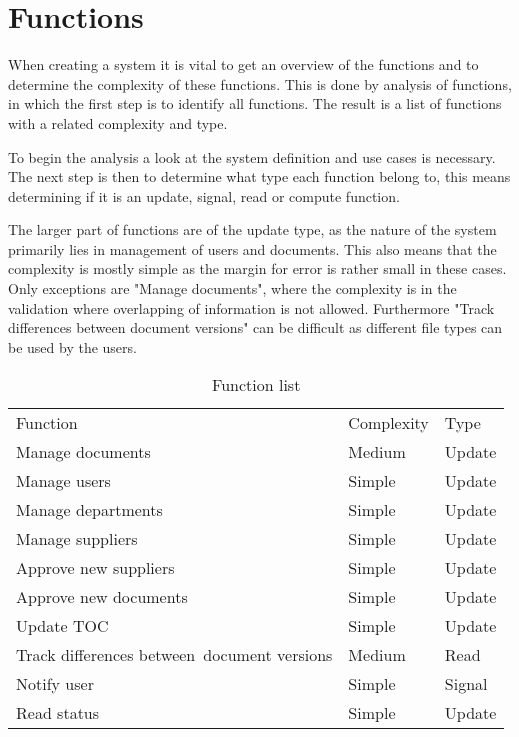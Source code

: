\section{Functions}
When creating a system it is vital to get an overview of the functions and to determine the complexity of these functions. This is done by analysis of functions, in which the first step is to identify all functions. The result is a list of functions with a related complexity and type.

To begin the analysis a look at the system definition and use cases is necessary. The next step is then to determine what type each function belong to, this means determining if it is an update, signal, read or compute function.

The larger part of functions are of the update type, as the nature of the system primarily lies in management of users and documents. This also means that the complexity is mostly simple as the margin for error is rather small in these cases. Only exceptions are "Manage documents", where the complexity is in the validation where overlapping of information is not allowed. Furthermore "Track differences between document versions" can be difficult as different file types can be used by the users.

\begin{table}[H]
\centering
\begin{tabular}{lll}
Function                                    & Complexity & Type    \\
Manage documents                            & Medium     & Update  \\
Manage users                                & Simple     & Update  \\
Manage departments                          & Simple     & Update  \\
Manage suppliers                            & Simple     & Update  \\
Approve new suppliers                       & Simple     & Update  \\
Approve new documents                       & Simple     & Update  \\
Update TOC                                  & Simple     & Update  \\
Track differences between~document versions & Medium     & Read    \\
Notify user                                 & Simple     & Signal  \\
Read status                                 & Simple     & Update 
\end{tabular}
\caption{Function list}
\end{table}


